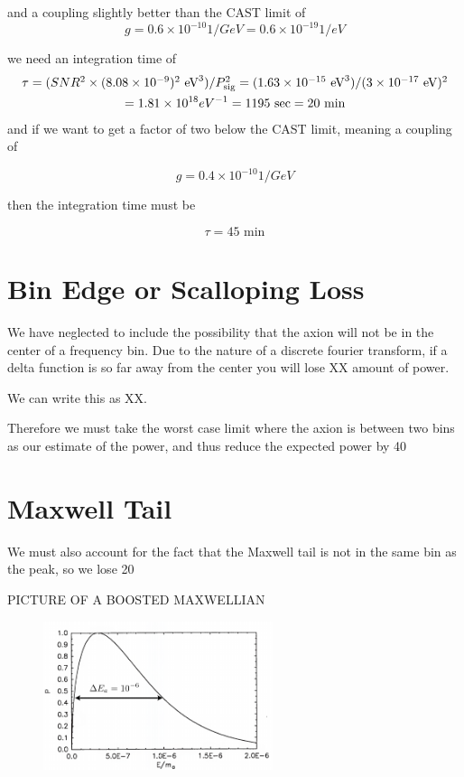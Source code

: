 \documentclass[11pt]{article}
\begin{document}
and a coupling slightly better than the CAST limit of
 $$g = 0.6 \times 10^{-10} 1/GeV = 0.6 \times 10^{-19} 1/eV$$

we need an integration time of 
\begin{multline}
$$\tau = (SNR^2 \times (8.08\times10^{-9})^2 \text{ eV}^3) /P_{\text{sig}}^2= (1.63\times10^{-15} \text{ eV}^3)/(3\times10^{-17}\text{ eV})^2 \\ = 1.81 \times 10^{18} eV^{-1} = 1195\text{ sec} =20\text{ min}$$
\end{multline}
and if we want to get a factor of two below the CAST limit, meaning a coupling of

$$g = 0.4 \times 10^{-10} 1/GeV$$

then the integration time must be

$$\tau = 45\text{ min}$$

\section{Bin Edge or Scalloping Loss}

We have neglected to include the possibility that the axion will not be in the center of a frequency bin. Due to the nature of a discrete fourier transform, if a delta function is so far away from the center you will lose XX amount of power. 

We can write this as XX.

Therefore we must take the worst case limit where the axion is between two bins as our estimate of the power, and thus reduce the expected power by 40%

\section{Maxwell Tail}

We must also account for the fact that the Maxwell tail is not in the same bin as the peak, so we lose 20%

PICTURE OF A BOOSTED MAXWELLIAN
\begin{figure}
\includegraphics[width=0.6\textwidth]{boostedmaxwellianarrow}
\end{figure}
\end{document}
